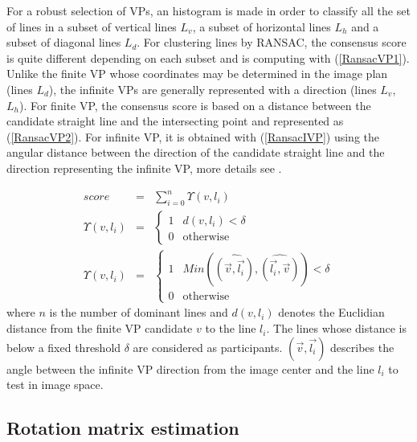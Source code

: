 For a robust selection of VPs, an histogram is made in order to classify
all the set of lines in a subset of vertical lines  $L_v$, a subset of horizontal lines $L_h$ and a subset
of diagonal lines $L_d$. For clustering lines by RANSAC, the consensus score is quite different
depending on each subset and is computing with (\ref{RansacVP1}). Unlike the finite VP whose coordinates may be determined in
the image plan (lines $L_d$), the infinite VPs are generally represented with a
direction (lines $L_v$, $L_h$). For finite VP, the consensus score is based on a
distance between the candidate straight line and the
intersecting point and represented as (\ref{RansacVP2}). For infinite VP, it is obtained with (\ref{RansacIVP}) using the angular
distance between the direction of the candidate straight line
and the direction representing the infinite VP,  more details see \cite{Elloumi2014}.

\begin{eqnarray}
	score &=&  \sum_{i=0}^{n} \Upsilon(v,l_i)  \label{RansacVP1} \\
  	\Upsilon(v,l_i)  &=&  \left \{\begin{array}{ll}
 	                   1 & d(v,l_i) < \delta\\
 	                   0 &  \text{otherwise}
 	                  \end{array} \right.       \label{RansacVP2} \\
	 \Upsilon(v,l_i) &=&  \left \{\begin{array}{ll}
 	                   1 & Min(\widehat{(\overrightarrow{v},\overrightarrow{l_i})},\widehat{(\overrightarrow{l_i},\overrightarrow{v})}) < \delta\\
 	                   0 & \text{otherwise}
 	                  \end{array} \right.   \label{RansacIVP}
 \end{eqnarray}
where $n$ is the number of dominant lines and $d(v, l_i)$ denotes the
Euclidian distance from the finite VP candidate $v$ to the line $l_i$.
The lines whose distance is below a fixed threshold $\delta$ are
considered as participants. $(\overrightarrow{v},\overrightarrow{l_i})$ describes the angle between the infinite VP direction
from the image center and the line $l_i$ to test in image space. \color{black}

\subsection{Rotation matrix estimation}


